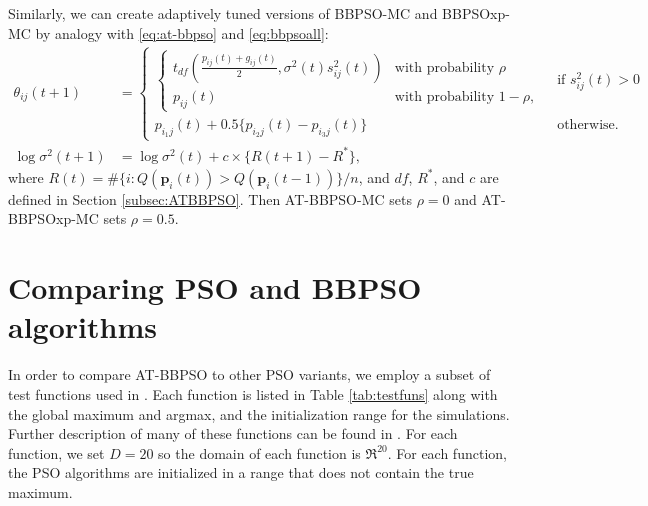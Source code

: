 \documentclass[cmbright]{staauth}
\begin{document}
Similarly, we can create adaptively tuned versions of BBPSO-MC and BBPSOxp-MC by analogy with \eqref{eq:at-bbpso} and \eqref{eq:bbpsoall}:
\begin{align*}%
\theta_{ij}(t+1) &=
  \begin{cases}
    \begin{cases} t_{df}\left(\frac{p_{ij}(t) + g_{ij}(t)}{2}, \sigma^2(t)s^2_{ij}(t)\right) & \mbox{with probability } \rho\\
      p_{ij}(t) & \mbox{with probability } 1 - \rho,
    \end{cases}
    & \mbox{ if } s^2_{ij}(t) > 0\\
    p_{i_1j}(t) + 0.5\{p_{i_2j}(t) - p_{i_3j}(t)\} & \mbox{ otherwise.}
  \end{cases}\\
\log\sigma^2(t+1) &= \log\sigma^2(t) + c\times\{R(t+1) - R^*\},
\end{align*}
where $R(t)=\#\{i:Q(\bm{p}_i(t))> Q(\bm{p}_i(t-1))\}/n$, and $df$, $R^*$, and $c$ are defined in Section \ref{subsec:ATBBPSO}. Then AT-BBPSO-MC sets $\rho=0$ and AT-BBPSOxp-MC sets $\rho=0.5$.

\section{Comparing PSO and BBPSO algorithms}\label{app:psocompare}
In order to compare AT-BBPSO to other PSO variants, we employ a subset of test functions used in \citet{hsieh2010modified}. Each function is listed in Table \ref{tab:testfuns} along with the global maximum and argmax, and the initialization range for the simulations. Further description of many of these functions can be found in \citet{clerc2010particle}. For each function, we set $D=20$ so the domain of each function is $\Re^{20}$. For each function, the PSO algorithms are initialized in a range that does not contain the true maximum.
\end{document}
